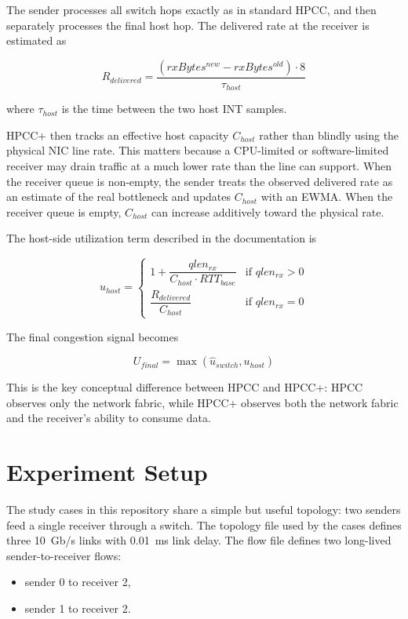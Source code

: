 \documentclass[11pt,a4paper]{article}
\begin{document}
The sender processes all switch hops exactly as in standard HPCC, and then separately processes the final host hop. The delivered rate at the receiver is estimated as

\[
R_{delivered} = \frac{(rxBytes^{new} - rxBytes^{old}) \cdot 8}{\tau_{host}}
\]

where $\tau_{host}$ is the time between the two host INT samples.

HPCC+ then tracks an effective host capacity $C_{host}$ rather than blindly using the physical NIC line rate. This matters because a CPU-limited or software-limited receiver may drain traffic at a much lower rate than the line can support. When the receiver queue is non-empty, the sender treats the observed delivered rate as an estimate of the real bottleneck and updates $C_{host}$ with an EWMA. When the receiver queue is empty, $C_{host}$ can increase additively toward the physical rate.

The host-side utilization term described in the documentation is

\[
u_{host} =
\begin{cases}
1 + \dfrac{qlen_{rx}}{C_{host} \cdot RTT_{base}} & \text{if } qlen_{rx} > 0 \\
\dfrac{R_{delivered}}{C_{host}} & \text{if } qlen_{rx} = 0
\end{cases}
\]

The final congestion signal becomes

\[
U_{final} = \max(\hat{u}_{switch}, u_{host})
\]

This is the key conceptual difference between HPCC and HPCC+: HPCC observes only the network fabric, while HPCC+ observes both the network fabric and the receiver's ability to consume data.

\section{Experiment Setup}

The study cases in this repository share a simple but useful topology: two senders feed a single receiver through a switch. The topology file used by the cases defines three 10~Gb/s links with 0.01~ms link delay. The flow file defines two long-lived sender-to-receiver flows:

\begin{itemize}
    \item sender 0 to receiver 2,
    \item sender 1 to receiver 2.
\end{itemize}
\end{document}
